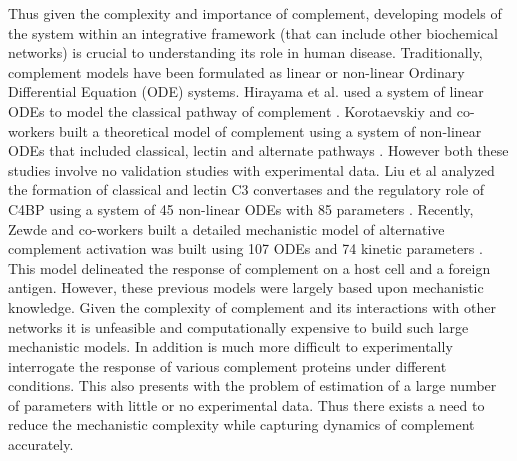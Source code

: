 \documentclass[12pt]{article}
\begin{document}
Thus given the complexity and importance of complement, developing models of the system within an integrative framework (that can include other biochemical networks) is crucial to understanding its role in human disease. Traditionally, complement models have been formulated as linear or non-linear Ordinary Differential Equation (ODE) systems. Hirayama  et al. used a system of linear ODEs to model the classical pathway of complement \cite{hirayama1996linear}. Korotaevskiy and co-workers built a theoretical model of complement using a system of non-linear ODEs that included classical, lectin and alternate pathways \cite{korotaevskiy2009non}. However both these studies involve no validation studies with experimental data. Liu et al analyzed the formation of classical and lectin C3 convertases and the regulatory role of C4BP using a system of 45 non-linear ODEs with 85 parameters \cite{liu2011computational}.  Recently, Zewde and co-workers built a detailed mechanistic model of alternative complement activation was built using 107 ODEs and 74 kinetic parameters \cite{zewde2016quantitative}. This model delineated the response of complement on a host cell and a foreign antigen. However, these previous models were largely based upon mechanistic knowledge.  Given the complexity of complement and its interactions with other networks it is unfeasible and computationally expensive to build such large mechanistic models. In addition is much more difficult to experimentally interrogate the response of various complement proteins under different conditions. This also presents with the problem of estimation of a large number of parameters with little or no experimental data. Thus there exists a need to reduce the mechanistic complexity while capturing dynamics of complement accurately.
\end{document}

